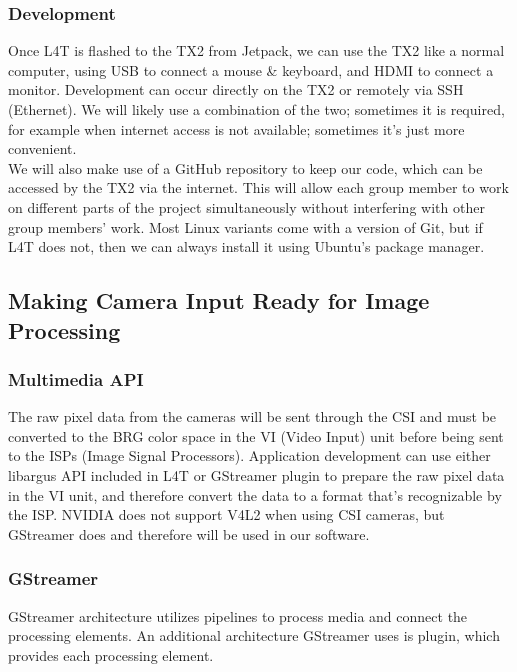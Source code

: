 \documentclass[letterpaper,10pt,serif,draftclsnofoot,onecolumn,compsoc,titlepage]{IEEEtran}
\begin{document}
\subsubsection{Development}
Once L4T is flashed to the TX2 from Jetpack, we can use the TX2 like a normal computer, using USB to connect a mouse \& keyboard, and HDMI to connect a monitor. Development can occur directly on the TX2 or remotely via SSH (Ethernet). We will likely use a combination of the two; sometimes it is required, for example when internet access is not available; sometimes it’s just more convenient. \\

We will also make use of a GitHub repository to keep our code, which can be accessed by the TX2 via the internet. This will allow each group member to work on different parts of the project simultaneously without interfering with other group members’ work. Most Linux variants come with a version of Git, but if L4T does not, then we can always install it using Ubuntu’s package manager. \\

\subsection{Making Camera Input Ready for Image Processing}

\subsubsection{Multimedia API}

The raw pixel data from the cameras will be sent through the CSI and must be converted 
to the BRG color space in the VI (Video Input) unit before being sent to the ISPs 
(Image Signal Processors). Application development can use either libargus API 
included in L4T or GStreamer plugin to prepare the raw pixel data in the VI unit, and 
therefore convert the data to a format that’s recognizable by the ISP. NVIDIA does not 
support V4L2 when using CSI cameras, but GStreamer does and therefore will be used in 
our software.  \\

\subsubsection{GStreamer}

GStreamer architecture utilizes pipelines to process media and connect the processing 
elements. An additional architecture GStreamer uses is plugin, which provides each 
processing element. \\
\end{document}
